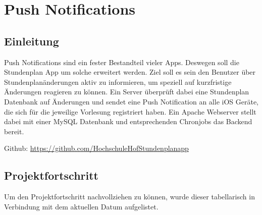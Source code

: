 \chapter{Push Notifications}



\section{Einleitung}
Push Notifications sind ein fester Bestandteil vieler Apps. Deswegen soll die Stundenplan App um solche erweitert werden. Ziel soll es sein den Benutzer über Stundenplanänderungen aktiv zu informieren, um speziell auf kurzfristige Änderungen reagieren zu können. Ein Server überprüft dabei eine Stundenplan Datenbank auf Änderungen und sendet eine Push Notification an alle iOS Geräte, die sich für die jeweilige Vorlesung registriert haben. Ein Apache Webserver stellt dabei mit einer MySQL Datenbank und entsprechenden Chronjobs das Backend bereit.

Github: \url{https://github.com/HochschuleHofStundenplanapp}


\section{Projektfortschritt}
Um den Projektfortschritt nachvollziehen zu können, wurde dieser tabellarisch in Verbindung mit dem aktuellen Datum aufgelistet.


